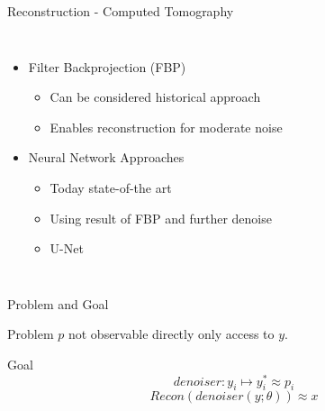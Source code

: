 \begin{frame}{Reconstruction -  Computed Tomography}
    \begin{columns}
        
        \begin{itemize}
            \item Filter Backprojection (FBP)
            \begin{itemize}
                \item Can be considered historical approach
                \item Enables reconstruction for moderate noise
            \end{itemize}
            \item<3> Neural Network Approaches
            \begin{itemize}
                \item Today state-of-the art
                \item Using result of FBP and further denoise
                \item U-Net \cite{unet-tomography}
            \end{itemize}
        \end{itemize}


    \end{columns}
\end{frame}



\begin{frame}{Problem and Goal}
    \pause
    \begin{block}{Problem}
        $p$ not observable directly only access to $y$.
    \end{block}
    \pause
    \begin{block}{Goal}
        $$ denoiser:   y_i \mapsto y_i^* \approx p_i $$
        $$ \textit{Recon} \left( denoiser(y; \theta) \right) \approx x $$
    \end{block}

\end{frame}


